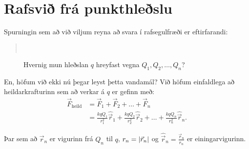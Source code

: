 \ifdefined \wholebook \else\documentclass[oneside]{book}\usepackage{EdlBook}\graphicspath{{figures/}}
\begin{document}
\section{Rafsvið frá punkthleðslu}

Spurningin sem að við viljum reyna að svara í rafsegulfræði er eftirfarandi:

\blockquote{ \\ \phantom{.} \hfill \textbf{}}


\begin{figure}[H]
    \centering
    \caption{Hvernig mun hleðslan $q$ hreyfast vegna $Q_1, Q_2, \ldots, Q_n$?}
\end{figure}

En, höfum við ekki nú þegar leyst þetta vandamál? Við höfum einfaldlega að heildarkrafturinn sem að verkar á $q$ er gefinn með:
\begin{align*}
    \vec{F}_{\text{heild}} &= \vec{F}_1 + \vec{F}_2 + \ldots + \vec{F}_n \\
    &= \frac{kqQ_1}{r_1^2} \hat{\vec{r}}_1 + \frac{kqQ_2}{r_2^2} \hat{\vec{r}}_2 + \ldots + \frac{kqQ_n}{r_n^2} \hat{\vec{r}}_n.
\end{align*}

Þar sem að $\vec{r}_n$ er vigurinn frá $Q_n$ til $q$, $r_n = \abs{\vec{r}_n}$ og $\hat{\vec{r}}_n = \frac{\vec{r}_n}{r_n}$ er einingarvigurinn.
\end{document}
